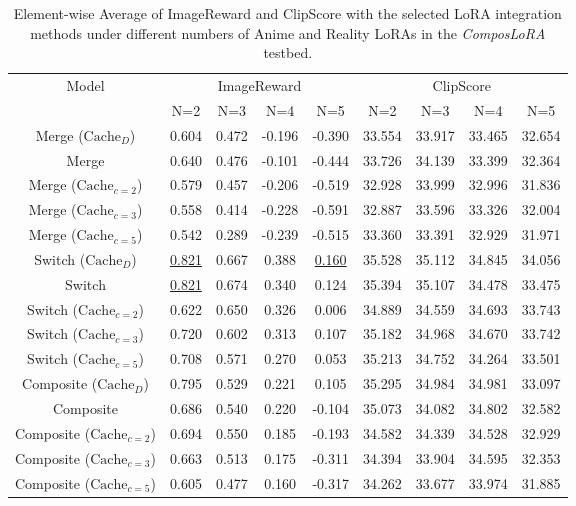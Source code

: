 \begin{table}[H]
\caption{Element-wise Average of ImageReward and ClipScore with the selected LoRA integration methods under different numbers of Anime and Reality LoRAs in the \textit{ComposLoRA} testbed.}
\label{averageirclip}
\begin{center}
\begin{tabular}{c|cccc|cccc}
\toprule
\multirow{2}{*}{Model} & \multicolumn{4}{c|}{ImageReward} & \multicolumn{4}{c}{ClipScore} \\
\cmidrule(lr){2-5} \cmidrule(lr){6-9}
& N=2 & N=3 & N=4 & N=5 & N=2 & N=3 & N=4 & N=5 \\
\midrule
Merge ($\text{Cache}_{D}$) & 0.604 & 0.472 & -0.196 & -0.390 & 33.554 & 33.917 & 33.465 & 32.654 \\
Merge & 0.640 & 0.476 & -0.101 & -0.444 & 33.726 & 34.139 & 33.399 & 32.364 \\
Merge ($\text{Cache}_{c=2}$) & 0.579 & 0.457 & -0.206 & -0.519 & 32.928 & 33.999 & 32.996 & 31.836 \\
Merge ($\text{Cache}_{c=3}$) & 0.558 & 0.414 & -0.228 & -0.591 & 32.887 & 33.596 & 33.326 & 32.004 \\
Merge ($\text{Cache}_{c=5}$) & 0.542 & 0.289 & -0.239 & -0.515 & 33.360 & 33.391 & 32.929 & 31.971 \\

Switch ($\text{Cache}_{D}$) & \underline{0.821} & 0.667 & 0.388 & \underline{0.160} & 35.528 & 35.112 & 34.845 & 34.056 \\
Switch & \underline{0.821} & 0.674 & 0.340 & 0.124 & 35.394 & 35.107 & 34.478 & 33.475 \\
Switch ($\text{Cache}_{c=2}$) & 0.622 & 0.650 & 0.326 & 0.006 & 34.889 & 34.559 & 34.693 & 33.743 \\
Switch ($\text{Cache}_{c=3}$) & 0.720 & 0.602 & 0.313 & 0.107 & 35.182 & 34.968 & 34.670 & 33.742 \\
Switch ($\text{Cache}_{c=5}$) & 0.708 & 0.571 & 0.270 & 0.053 & 35.213 & 34.752 & 34.264 & 33.501 \\

Composite ($\text{Cache}_{D}$) & 0.795 & 0.529 & 0.221 & 0.105 & 35.295 & 34.984 & 34.981 & 33.097 \\
Composite & 0.686 & 0.540 & 0.220 & -0.104 & 35.073 & 34.082 & 34.802 & 32.582 \\
Composite ($\text{Cache}_{c=2}$) & 0.694 & 0.550 & 0.185 & -0.193 & 34.582 & 34.339 & 34.528 & 32.929 \\
Composite ($\text{Cache}_{c=3}$) & 0.663 & 0.513 & 0.175 & -0.311 & 34.394 & 33.904 & 34.595 & 32.353 \\
Composite ($\text{Cache}_{c=5}$) & 0.605 & 0.477 & 0.160 & -0.317 & 34.262 & 33.677 & 33.974 & 31.885 \\


\end{tabular}
\end{center}
\end{table}
